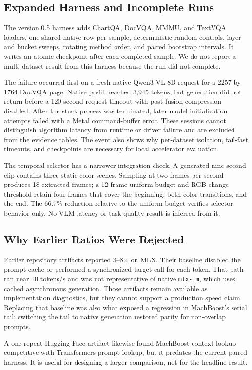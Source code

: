 \documentclass[11pt]{article}
\begin{document}
\subsection{Expanded Harness and Incomplete Runs}
The version 0.5 harness adds ChartQA, DocVQA, MMMU, and TextVQA loaders, one shared native row per sample, deterministic random controls, layer and bucket sweeps, rotating method order, and paired bootstrap intervals. It writes an atomic checkpoint after each completed sample. We do not report a multi-dataset result from this harness because the run did not complete.

The failure occurred first on a fresh native Qwen3-VL 8B request for a 2257 by 1764 DocVQA page. Native prefill reached 3,945 tokens, but generation did not return before a 120-second request timeout with post-fusion compression disabled. After the stuck process was terminated, later model initialization attempts failed with a Metal command-buffer error. These sessions cannot distinguish algorithm latency from runtime or driver failure and are excluded from the evidence tables. The event also shows why per-dataset isolation, fail-fast timeouts, and checkpoints are necessary for local accelerator evaluation.

The temporal selector has a narrower integration check. A generated nine-second clip contains three static color scenes. Sampling at two frames per second produces 18 extracted frames; a 12-frame uniform budget and RGB change threshold retain four frames that cover the beginning, both color transitions, and the end. The 66.7\% reduction relative to the uniform budget verifies selector behavior only. No VLM latency or task-quality result is inferred from it.

\subsection{Why Earlier Ratios Were Rejected}
Earlier repository artifacts reported 3--8$\times$ on MLX. Their baseline disabled the prompt cache or performed a synchronized target call for each token. That path ran near 10 tokens/s and was not representative of native \texttt{mlx-lm}, which uses cached asynchronous generation. Those artifacts remain available as implementation diagnostics, but they cannot support a production speed claim. Replacing that baseline was also what exposed a regression in MachBoost's serial tail; switching the tail to native generation restored parity for non-overlap prompts.

A one-repeat Hugging Face artifact likewise found MachBoost context lookup competitive with Transformers prompt lookup, but it predates the current paired harness. It is useful for designing a larger comparison, not for the headline result.
\end{document}
